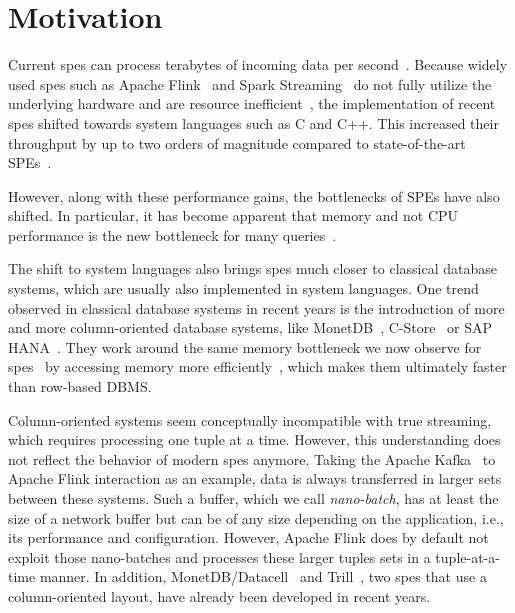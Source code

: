 \section{Motivation}
\label{sec:motivation}

Current \acp{spe} can process terabytes of incoming data per second~\cite[]{alibaba}.
Because widely used \acp{spe} such as Apache Flink~\cite{DBLP:journals/debu/CarboneKEMHT15} and Spark Streaming~\cite{DBLP:journals/cacm/ZahariaXWDADMRV16} do not fully utilize the underlying hardware and are resource inefficient~\cite[]{DBLP:conf/icde/ZhangHDZH17,DBLP:journals/pvldb/ZeuchBRMKLRTM19}, the implementation of recent \acp{spe} shifted towards system languages such as C and C++. 
This increased their throughput by up to two orders of magnitude compared to state-of-the-art SPEs~\cite[]{DBLP:journals/pvldb/ZeuchBRMKLRTM19}.

However, along with these performance gains, the bottlenecks of SPEs have also shifted.
In particular, it has become apparent that memory and not CPU performance is the new bottleneck for many queries~\cite[]{bollmeier2021processor}.

The shift to system languages also brings \acp{spe} much closer to classical database systems, which are usually also implemented in system languages.
One trend observed in classical database systems in recent years is the introduction of more and more column-oriented database systems, like MonetDB~\cite[]{DBLP:journals/debu/IdreosGNMMK12,DBLP:conf/cidr/BonczZN05,DBLP:journals/vldb/BonczK99}, C-Store~\cite[]{DBLP:conf/vldb/StonebrakerABCCFLLMOORTZ05} or SAP HANA~\cite[]{DBLP:conf/sigmod/SikkaFLCPB12}.
They work around the same memory bottleneck we now observe for \acp{spe}~\cite[]{DBLP:conf/vldb/BonczMK99} by accessing memory more efficiently~\cite[]{DBLP:conf/sigmod/AbadiMH08}, which makes them ultimately faster than row-based DBMS.

Column-oriented systems seem conceptually incompatible with true streaming, which requires processing one tuple at a time.
However, this understanding does not reflect the behavior of modern \acp{spe} anymore.
Taking the Apache Kafka~\cite{Kreps2011KafkaA} to Apache Flink interaction as an example, data is always transferred in larger sets between these systems.
Such a buffer, which we call \emph{nano-batch}, has at least the size of a network buffer but can be of any size depending on the application, i.e., its performance and configuration.
However, Apache Flink does by default not exploit those nano-batches and processes these larger tuples sets in a tuple-at-a-time manner.
In addition, MonetDB/Datacell~\cite[]{DBLP:journals/pvldb/LiarouIMK12} and Trill~\cite[]{DBLP:journals/pvldb/ChandramouliGBDPTW14}, two \acp{spe} that use a column-oriented layout, have already been developed in recent years.

